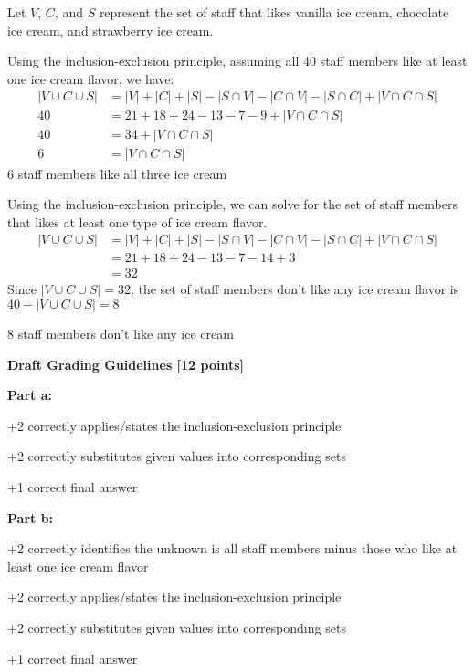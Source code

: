 \documentclass[12pt]{exam}
\begin{document}
\begin{solution}
    Let $V$, $C$, and $S$ represent the set of staff that likes vanilla ice cream, chocolate ice cream, and strawberry ice cream. 
    
    \begin{parts}
        \item 
    
        Using the inclusion-exclusion principle, assuming all 40 staff members like at least one ice cream flavor, we have:
            \begin{align*}
            |V \cup C \cup S| &= |V| + |C| + |S| - |S \cap V| - |C \cap V| - |S \cap C| + |V \cap C \cap S| \\
            40 &= 21 + 18 + 24 - 13 - 7 - 9 + |V \cap C \cap S| \\
            40 &= 34 + |V \cap C \cap S| \\
            6 &= |V \cap C \cap S|
            \end{align*}
        6 staff members like all three ice cream
        
        
        \item 
    
        Using the inclusion-exclusion principle, we can solve for the set of staff members that likes at least one type of ice cream flavor.
            \begin{align*}
            |V \cup C \cup S| &= |V| + |C| + |S| - |S \cap V| - |C \cap V| - |S \cap C| + |V \cap C \cap S| \\
            &= 21 + 18 + 24 - 13 - 7 - 14 + 3 \\
            &= 32
            \end{align*}
        Since $|V \cup C \cup S| = 32$, the set of staff members don't like any ice cream flavor is $40 - |V \cup C \cup S| = 8$
        
        8 staff members don't like any ice cream
        
    \end{parts}

    \textbf{Draft Grading Guidelines [12 points]}

    \textbf{Part a:}
    \begin{guidelines}
        \item +2 correctly applies/states the inclusion-exclusion principle
        \item +2 correctly substitutes given values into corresponding sets
        \item +1 correct final answer
    \end{guidelines}
    \textbf{Part b:}
    \begin{guidelines}
        \item +2 correctly identifies the unknown is all staff members minus those who like at least one ice cream flavor
        \item +2 correctly applies/states the inclusion-exclusion principle
        \item +2 correctly substitutes given values into corresponding sets
        \item +1 correct final answer
    \end{guidelines}
\end{solution}
\end{document}
